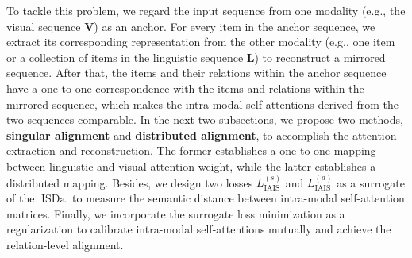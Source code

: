 \documentclass[11pt,a4paper]{article}
\begin{document}
To tackle this problem, we regard the input sequence from one modality (e.g., the visual sequence $\mathbf{V}$) as an anchor.
For every item in the anchor sequence, we extract its corresponding representation from the other modality (e.g., one item or a collection of items in the linguistic sequence $\mathbf{L}$) to reconstruct a mirrored sequence. 
After that, the items and their relations within the anchor sequence have a one-to-one correspondence with the items and relations within the mirrored sequence, 
which makes the intra-modal self-attentions derived from the two sequences comparable. 
In the next two subsections, we propose two methods, \textbf{singular alignment} and \textbf{distributed alignment}, to accomplish the attention extraction and reconstruction. 
The former establishes a one-to-one mapping between linguistic and visual attention weight, while the latter establishes a distributed mapping.
Besides, we design two losses $L^{(s)}_\text{IAIS}$ and $L^{(d)}_\text{IAIS}$ as a surrogate of the $\operatorname{ISDa}$ to measure the semantic distance between intra-modal self-attention matrices. 
Finally, we incorporate the surrogate loss minimization as a regularization to calibrate intra-modal self-attentions mutually and achieve the relation-level alignment.
\end{document}
